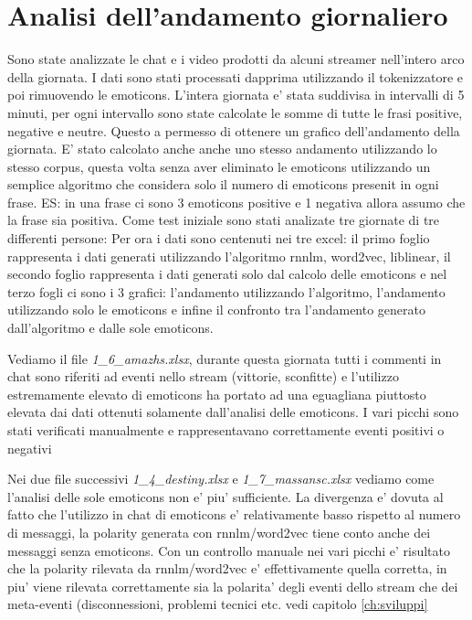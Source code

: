 \documentclass[a4paper,11pt]{book}
\theoremstyle{definition}
\begin{document}
\chapter{Analisi dell'andamento giornaliero}
Sono state analizzate le chat e i video prodotti da alcuni streamer nell'intero arco della giornata. I dati sono stati processati dapprima utilizzando il tokenizzatore e poi rimuovendo le emoticons. L'intera giornata e' stata suddivisa in intervalli di 5 minuti, per ogni intervallo sono state calcolate le somme di tutte le frasi positive, negative e neutre. Questo a permesso di ottenere un grafico dell'andamento della giornata.
E' stato calcolato anche anche uno stesso andamento utilizzando lo stesso corpus, questa volta senza aver eliminato le emoticons utilizzando un semplice algoritmo che considera solo il numero di emoticons presenit in ogni frase. ES: in una frase ci sono 3 emoticons positive e 1 negativa allora assumo che la frase sia positiva.
Come test iniziale sono stati analizate tre giornate di tre differenti persone:
\newline
\newline
Per ora i dati sono centenuti nei tre excel: il primo foglio rappresenta i dati generati utilizzando l'algoritmo rnnlm, word2vec, liblinear, il secondo foglio rappresenta i dati generati solo dal calcolo delle emoticons e nel terzo fogli ci sono i 3 grafici: l'andamento utilizzando l'algoritmo, l'andamento utilizzando solo le emoticons e infine il confronto tra l'andamento generato dall'algoritmo e dalle sole emoticons.

Vediamo il file \emph{1\_6\_amazhs.xlsx}, durante questa giornata tutti i commenti in chat sono riferiti ad eventi nello stream (vittorie, sconfitte) e l'utilizzo estremamente elevato di emoticons ha portato ad una eguagliana piuttosto elevata dai dati ottenuti solamente dall'analisi delle emoticons. I vari picchi sono stati verificati manualmente e rappresentavano correttamente eventi positivi o negativi

Nei due file successivi \emph{1\_4\_destiny.xlsx} e \emph{1\_7\_massansc.xlsx} vediamo come l'analisi delle sole emoticons non e' piu' sufficiente. La divergenza e' dovuta al fatto che l'utilizzo in chat di emoticons e' relativamente basso rispetto al numero di messaggi, la polarity generata con rnnlm/word2vec tiene conto anche dei messaggi senza emoticons. Con un controllo manuale nei vari picchi e' risultato che la polarity rilevata da rnnlm/word2vec e' effettivamente quella corretta, in piu' viene rilevata correttamente sia la polarita' degli eventi dello stream che dei meta-eventi (disconnessioni, problemi tecnici etc. vedi capitolo \ref{ch:sviluppi}
\end{document}
